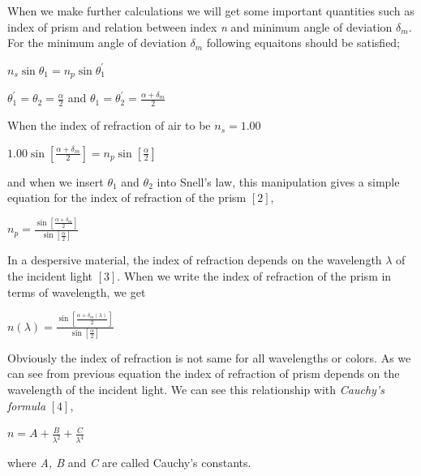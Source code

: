 \documentclass[a4paper,12pt]{report}
\begin{document}
When we make further calculations we will get some important quantities such as index of prism and relation between index \textit{n} and minimum angle of deviation $\delta_{m}$. For the minimum angle of deviation $\delta_{m}$ following equaitons should be satisfied;
\begin{center}
	{\large $n_{s}\sin\theta_{1}=n_{p}\sin\theta_{1}^{\prime}$}
\end{center}
\begin{center}
	 {\large $\theta_{1}^{\prime}=\theta_{2}=\frac{\alpha}{2}$ and $\theta_{1}=\theta_{2}^{\prime}=\frac{\alpha+\delta_{m}}{2}$}
\end{center}
When the index of refraction of air to be $n_{s}=1.00$
\begin{center}
{\large 	$1.00\sin[\frac{\alpha+\delta_{m}}{2}]=n_{p}\sin[\frac{\alpha}{2}]$}
\end{center}
and when we insert $\theta_{1}$ and $\theta_{2}$ into Snell's law, this manipulation gives a simple equation for the index of refraction of the prism $[2]$,
\begin{center}
	{\Large $n_{p}=\frac{\sin[\frac{\alpha+\delta_{m}}{2}]}{\sin[\frac{\alpha}{2}]}$}
\end{center}
In a despersive material, the index of refraction depends on the wavelength $\lambda$ of the incident light $[3]$. When we write the index of refraction of the prism in terms of wavelength, we get   
\begin{center}
	{\Large $n(\lambda)=\frac{\sin[\frac{\alpha+\delta_{m}(\lambda)}{2}]}{\sin[\frac{\alpha}{2}]}$}
\end{center}
Obviously the index of refraction is not same for all wavelengths or colors. As we can see from previous equation the index of refraction of prism depends on the wavelength of the incident light. We can see this relationship with \textit{Cauchy's formula} $[4]$,
\begin{center}
	{\Large $n=A+\frac{B}{\lambda^{2}}+\frac{C}{\lambda^{4}}$}
\end{center}
where \textit{A, B} and \textit{C} are called Cauchy's constants.
\end{document}
